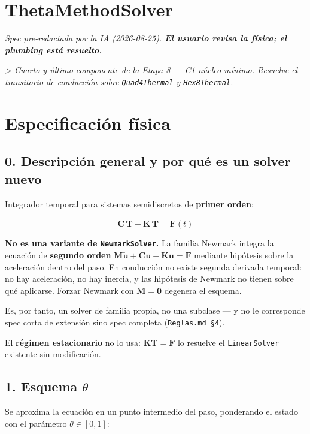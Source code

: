 \documentclass[11pt,letterpaper,oneside]{report}
\begin{document}
\newpage

\section{ThetaMethodSolver}



\textit{Spec pre-redactada por la IA (2026-08-25). \textbf{El usuario revisa la física; el plumbing está resuelto.}}

\textit{> Cuarto y último componente de la Etapa 8 --- C1 núcleo mínimo. Resuelve el transitorio de conducción sobre \texttt{Quad4Thermal} y \texttt{Hex8Thermal}.}



\section{Especificación física}

\subsection{0. Descripción general y por qué es un solver nuevo}

Integrador temporal para sistemas semidiscretos de \textbf{primer orden}:

\[
\mathbf C\,\dot{\mathbf T} + \mathbf K\,\mathbf T = \mathbf F(t)
\]

\textbf{No es una variante de \texttt{NewmarkSolver}.} La familia Newmark integra la ecuación de \textbf{segundo orden} $\mathbf M\ddot{\mathbf u} + \mathbf C\dot{\mathbf u} + \mathbf K\mathbf u = \mathbf F$ mediante hipótesis sobre la aceleración dentro del paso. En conducción no existe segunda derivada temporal: no hay aceleración, no hay inercia, y las hipótesis de Newmark no tienen sobre qué aplicarse. Forzar Newmark con $\mathbf M = \mathbf 0$ degenera el esquema.

Es, por tanto, un solver de familia propia, no una subclase --- y no le corresponde spec corta de extensión sino spec completa (\texttt{Reglas.md §4}).

El \textbf{régimen estacionario} no lo usa: $\mathbf K\mathbf T = \mathbf F$ lo resuelve el \texttt{LinearSolver} existente sin modificación.

\subsection{1. Esquema \ensuremath{\theta}}

Se aproxima la ecuación en un punto intermedio del paso, ponderando el estado con el parámetro $\theta \in [0,1]$:
\end{document}
